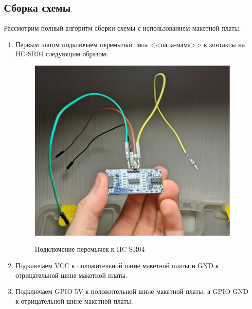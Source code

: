 \documentclass[a4paper, 14pt]{article}
\begin{document}
\subsection{Сборка схемы}

Рассмотрим полный алгоритм сборки схемы с использованием макетной платы:

\begin{enumerate}
	\item Первым шагом подключаем перемычки типа <<папа-мама>> в контакты на HC-SR04 следующим образом:
	      \begin{figure}[H]
		      \centering
		      \includegraphics[width=14cm]{screenshots/6.png}\\
		      \caption{Подключение перемычек к HC-SR04}
	      \end{figure}
	\item Подключаем VCC к положительной шине макетной платы и GND к отрицательной шине макетной платы.
	\item Подключаем GPIO 5V к положительной шине макетной платы, а GPIO GND к отрицательной шине макетной платы.
	      \begin{figure}[H]
		      \centering

\end{figure}
\end{enumerate}
\end{document}
